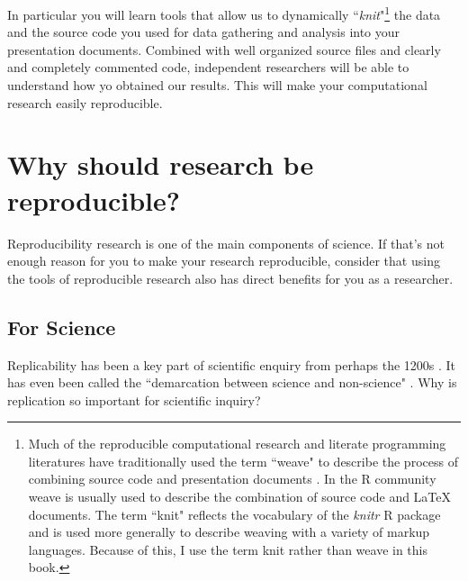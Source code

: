 In particular you will learn tools that allow us to dynamically ``{\emph{knit}}"\footnote{Much of the reproducible computational research and literate programming literatures have traditionally used the term ``weave" to describe the process of combining source code and presentation documents \cite[see][101]{Knuth1992}. In the R community weave is usually used to describe the combination of source code and LaTeX documents. The term ``knit" reflects the vocabulary of the {\emph{knitr}} R package and is used more generally to describe weaving with a variety of markup languages. Because of this, I use the term knit rather than weave in this book.} the data and the source code you used for data gathering and analysis into your presentation documents. Combined with well organized source files and clearly and completely commented code, independent researchers will be able to understand how yo obtained our results. This will make your computational research easily reproducible.


\section{Why should research be reproducible?}

Reproducibility research is one of the main components of science. If that's not enough reason for you to make your research reproducible, consider that using the tools of reproducible research also has direct benefits for you as a researcher. 

\subsection{For Science}

Replicability has been a key part of scientific enquiry from perhaps the 1200s \cite[]{Bacon1267,Nosek2012}. It has even been called the ``demarcation between science and non-science" \cite[2]{Braude1979}. Why is replication so important for scientific inquiry? 

